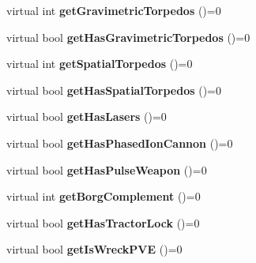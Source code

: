 \begin{DoxyCompactItemize}
\item 
\hypertarget{classPVEEntity_a699bdbd6f4f04f722cf463322924c3d7}{
virtual int {\bfseries getGravimetricTorpedos} ()=0}
\label{df/dde/classPVEEntity_a699bdbd6f4f04f722cf463322924c3d7}

\item 
\hypertarget{classPVEEntity_ac4ccef560d2f3116d25a991adcf29160}{
virtual bool {\bfseries getHasGravimetricTorpedos} ()=0}
\label{df/dde/classPVEEntity_ac4ccef560d2f3116d25a991adcf29160}

\item 
\hypertarget{classPVEEntity_a954f89529da48c1219d356003ea7bf9e}{
virtual int {\bfseries getSpatialTorpedos} ()=0}
\label{df/dde/classPVEEntity_a954f89529da48c1219d356003ea7bf9e}

\item 
\hypertarget{classPVEEntity_a0e6303e47a9989533246050d485a3269}{
virtual bool {\bfseries getHasSpatialTorpedos} ()=0}
\label{df/dde/classPVEEntity_a0e6303e47a9989533246050d485a3269}

\item 
\hypertarget{classPVEEntity_a70d57d0a3a2bf457b4773f15a32e3611}{
virtual bool {\bfseries getHasLasers} ()=0}
\label{df/dde/classPVEEntity_a70d57d0a3a2bf457b4773f15a32e3611}

\item 
\hypertarget{classPVEEntity_a3860cee61b565228e2ae06f46dc91ae0}{
virtual bool {\bfseries getHasPhasedIonCannon} ()=0}
\label{df/dde/classPVEEntity_a3860cee61b565228e2ae06f46dc91ae0}

\item 
\hypertarget{classPVEEntity_a84ba088b68a8405d7e77230b17133210}{
virtual bool {\bfseries getHasPulseWeapon} ()=0}
\label{df/dde/classPVEEntity_a84ba088b68a8405d7e77230b17133210}

\item 
\hypertarget{classPVEEntity_ae5222ad066788fccef43d5d18fd144ea}{
virtual int {\bfseries getBorgComplement} ()=0}
\label{df/dde/classPVEEntity_ae5222ad066788fccef43d5d18fd144ea}

\item 
\hypertarget{classPVEEntity_af2b571ab647e6442e8b1d51748ac8ac4}{
virtual bool {\bfseries getHasTractorLock} ()=0}
\label{df/dde/classPVEEntity_af2b571ab647e6442e8b1d51748ac8ac4}

\item 
\hypertarget{classPVEEntity_a8e8c12e80b764f737e26045ab55ba62f}{
virtual bool {\bfseries getIsWreckPVE} ()=0}
\label{df/dde/classPVEEntity_a8e8c12e80b764f737e26045ab55ba62f}


\end{DoxyCompactItemize}

